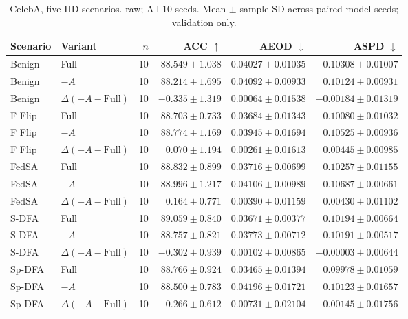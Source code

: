 \begin{table}[t]
\centering
\small
\caption{CelebA, five IID scenarios. raw; All 10 seeds. Mean $\pm$ sample SD across paired model seeds; validation only.}
\begin{tabular}{llrrrr}
\toprule
Scenario & Variant & $n$ & ACC $\uparrow$ & AEOD $\downarrow$ & ASPD $\downarrow$ \\
\midrule
Benign & Full & 10 & $88.549 \pm 1.038$ & $0.04027 \pm 0.01035$ & $0.10308 \pm 0.01007$ \\
Benign & $-A$ & 10 & $88.214 \pm 1.695$ & $0.04092 \pm 0.00933$ & $0.10124 \pm 0.00931$ \\
Benign & $\Delta(-A-\mathrm{Full})$ & 10 & $-0.335 \pm 1.319$ & $0.00064 \pm 0.01538$ & $-0.00184 \pm 0.01319$ \\
F Flip & Full & 10 & $88.703 \pm 0.733$ & $0.03684 \pm 0.01343$ & $0.10080 \pm 0.01032$ \\
F Flip & $-A$ & 10 & $88.774 \pm 1.169$ & $0.03945 \pm 0.01694$ & $0.10525 \pm 0.00936$ \\
F Flip & $\Delta(-A-\mathrm{Full})$ & 10 & $0.070 \pm 1.194$ & $0.00261 \pm 0.01613$ & $0.00445 \pm 0.00985$ \\
FedSA & Full & 10 & $88.832 \pm 0.899$ & $0.03716 \pm 0.00699$ & $0.10257 \pm 0.01155$ \\
FedSA & $-A$ & 10 & $88.996 \pm 1.217$ & $0.04106 \pm 0.00989$ & $0.10687 \pm 0.00661$ \\
FedSA & $\Delta(-A-\mathrm{Full})$ & 10 & $0.164 \pm 0.771$ & $0.00390 \pm 0.01159$ & $0.00430 \pm 0.01102$ \\
S-DFA & Full & 10 & $89.059 \pm 0.840$ & $0.03671 \pm 0.00377$ & $0.10194 \pm 0.00664$ \\
S-DFA & $-A$ & 10 & $88.757 \pm 0.821$ & $0.03773 \pm 0.00712$ & $0.10191 \pm 0.00517$ \\
S-DFA & $\Delta(-A-\mathrm{Full})$ & 10 & $-0.302 \pm 0.939$ & $0.00102 \pm 0.00865$ & $-0.00003 \pm 0.00644$ \\
Sp-DFA & Full & 10 & $88.766 \pm 0.924$ & $0.03465 \pm 0.01394$ & $0.09978 \pm 0.01059$ \\
Sp-DFA & $-A$ & 10 & $88.500 \pm 0.783$ & $0.04196 \pm 0.01721$ & $0.10123 \pm 0.01657$ \\
Sp-DFA & $\Delta(-A-\mathrm{Full})$ & 10 & $-0.266 \pm 0.612$ & $0.00731 \pm 0.02104$ & $0.00145 \pm 0.01756$ \\
\bottomrule
\end{tabular}
\end{table}


